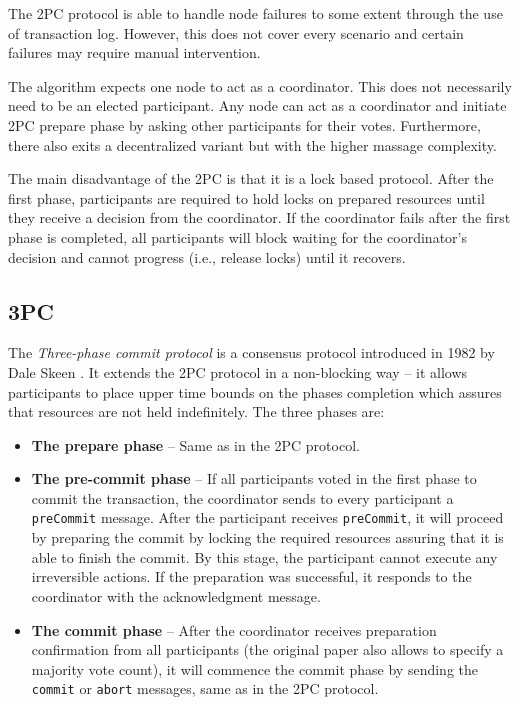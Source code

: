 \documentclass[oneside,
  digital, %
  table,   %
  lof,     %
  lot,     %
]{fithesis3}
\begin{document}
The 2PC protocol is able to handle node failures to some extent through the use of transaction log. However, this does not cover every scenario and certain failures may require manual intervention.

The algorithm expects one node to act as a coordinator. This does not necessarily need to be an elected participant. Any node can act as a coordinator and initiate 2PC prepare phase by asking other participants for their votes. Furthermore, there also exits a decentralized variant but with the higher massage complexity.

The main disadvantage of the 2PC is that it is a lock based protocol. After the first phase, participants are required to hold locks on prepared resources until they receive a decision from the coordinator. If the coordinator fails after the first phase is completed, all participants will block waiting for the coordinator's decision and cannot progress (i.e., release locks) until it recovers.

\subsection{3PC}

The \textit{Three-phase commit protocol} is a consensus protocol introduced in 1982 by Dale Skeen \cite{3PC}. It extends the 2PC protocol in a non-blocking way -- it allows participants to place upper time bounds on the phases completion which assures that resources are not held indefinitely. The three phases are:

\begin{itemize}
    \item \textbf{The prepare phase} -- Same as in the 2PC protocol.
    
    \item \textbf{The pre-commit phase} -- If all participants voted in the first phase to commit the transaction, the coordinator sends to every participant a \texttt{preCommit} message. After the participant receives \texttt{preCommit}, it will proceed by preparing the commit by locking the required resources assuring that it is able to finish the commit. By this stage, the participant cannot execute any irreversible actions. If the preparation was successful, it responds to the coordinator with the acknowledgment message.
    
    \item \textbf{The commit phase} -- After the coordinator receives preparation confirmation from all participants (the original paper \cite{3PC} also allows to specify a majority vote count), it will commence the commit phase by sending the \texttt{commit} or \texttt{abort} messages, same as in the 2PC protocol.
\end{itemize}
\end{document}
